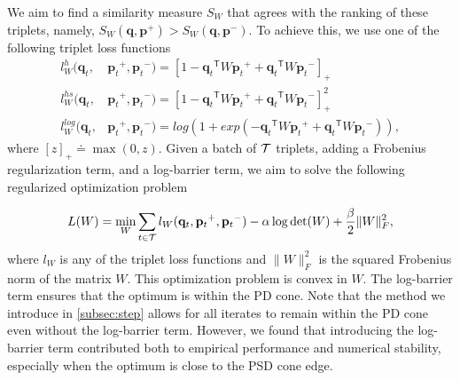 \documentclass[twoside,11pt]{article}
\newcommand\mat[1]{{#1}}
\renewcommand\vec[1]{\mathbf{#1}}
\newcommand{\T}{{}^\mathsf{T}}
\newcommand{\W}{\mat{W}}
\newcommand{\eqdef}{\doteq}
\newcommand{\frobsq}[1]{{\|#1\|_F^2}}
\newcommand{\ignore}[1]{}
\newcommand{\q}{{\vec{q}}}
\newcommand{\p}{{\vec{p}}}
\newcommand{\trip}{{t}}
\newcommand{\qt}{{\q_{\trip}}}
\newcommand{\pt}{{\p_{\trip}}}
\begin{document}
We aim to find a similarity measure $S_{\W}$ that agrees with the ranking of these triplets, namely, $S_{\W}(\q, \p^{+}) > S_{\W}(\q,
\p^{-})$. To achieve this, we use one of the following triplet loss functions
\begin{align}
\label{single-triplet-lossed}
l_{\W}^h(\qt, &\pt^{+}, \pt^{-}) = [1-\qt\T\W\pt^+ + \qt\T\W\pt^-]_{+}
 \\ \nonumber
l_{\W}^{hs}(\qt, &\pt^+, \pt^-) = [1-\qt\T\W\pt^+ + \qt\T\W\pt^-]_{+}^2
 \\ \nonumber
l_{\W}^{log}(\qt, &\pt^+, \pt^-) = log(1+exp(-\qt\T\W\pt^+ + \qt\T\W\pt^-)) \nonumber ,
\end{align}
where $[z]_{+} \eqdef \max(0,z)$. Given a batch of $\cal{T}$ triplets, adding a Frobenius regularization term, and a log-barrier term, we aim to solve the following regularized optimization problem

\begin{equation}
\label{eq-logdet-loss}
L(W) = 
  \min_{\W} \sum_{\trip \in \cal{T}}  l_{\W}(\qt, \pt^+, \pt^-) - \alpha \log \det(\W) + \frac{\beta}{2} \frobsq{\W},
\end{equation}
where $l_{\W}$ is any of the triplet loss functions and $\frobsq{\W}$ is the squared Frobenius norm of the matrix $\W$. This optimization problem is convex in $\W$.
The log-barrier term ensures that the optimum is within the PD cone. Note that the method we introduce in \ref{subsec:step} allows for all iterates to remain within the PD cone even without the log-barrier term. However, we found that introducing the log-barrier term contributed both to empirical performance and numerical stability, especially when the optimum is close to the PSD cone edge.


\ignore{
\begin{eqnarray}
  \min_{\W}& \sum_{\trip=1}^{\cal{T}}  l_{\W}(\qt, \pt^+, \pt^-) + \frac{\beta}{2} \frobsq{\W}
 \\  \nonumber
   \rm{s.t.}& \W \succ 0 \quad,
\label{hingelt}
\end{eqnarray}
}


\ignore{
Previous metric learning approaches \citep{OASIS, qianHD, qian}, solved the constrained optimization problem by SGD or stochastic mini-batch gradient steps, while repeatedly projecting back to the convex cone of PD matrices. This projection amounts to solving an eigendecomposition problem and is therefore costly in runtime. An alternative approach is to use a log-barrier term and avoid projecting onto the PD cone \citep{davis2007information,lego}, yielding}
\end{document}
